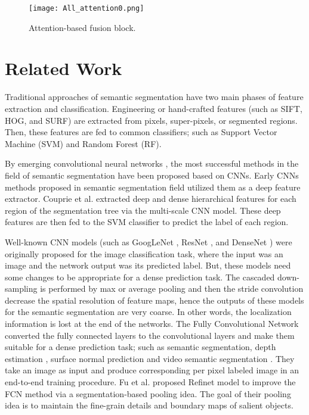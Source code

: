 \documentclass[journal,transmag]{IEEEtran}
\begin{document}
 
\begin{figure*}
	\begin{center}
		\texttt{[image: All\_attention0.png]}
	\end{center}
	\caption{Attention-based fusion block.}
	\label{fig:attention_block}
\end{figure*}

\section{Related Work}
\label{sec:2}

Traditional approaches of semantic segmentation\cite{ren2012rgb, silberman2011indoor, silberman2012indoor, gupta2013perceptual, gupta2014learning, cadena2013semantic,muller2014learning,shotton2006textonboost, fooladgardicta}  have two main phases of feature extraction and classification. Engineering or hand-crafted features (such as SIFT, HOG, and SURF) are extracted from pixels, super-pixels, or segmented regions. Then, these features are fed to common classifiers; such as Support Vector Machine (SVM)  and Random Forest (RF). 

By emerging convolutional neural networks \cite{krizhevsky2012imagenet, simonyan2014very,he2016deep}, the most successful methods in the field of semantic segmentation have been proposed based on CNNs. Early CNNs methods proposed in semantic segmentation field \cite{couprie2013indoor,girshick2014rich, farabet2013learning} utilized them as a deep feature extractor.  Couprie et al. \cite{couprie2013indoor} extracted deep and dense hierarchical features for each region of the segmentation tree \cite{arbelaez2011contour} via the multi-scale CNN model. These deep features are then fed to the SVM classifier to predict the label of each region.  

Well-known CNN models (such as GoogLeNet \cite{szegedy2015going}, ResNet \cite{he2016deep,he2016identity}, and DenseNet \cite{huang2017densely}) were originally proposed for the image classification task, where the input was an image and the network output was its predicted label. But, these models need some changes to be appropriate for a dense prediction task. The cascaded down-sampling is performed by max or average pooling and then the stride convolution decrease the spatial resolution of feature maps, hence the outputs of these models for the semantic segmentation are very coarse. In other words, the localization information is lost at the end of the networks. The Fully Convolutional Network \cite{long2015fully,long2015fully_jo} converted the fully connected layers to the convolutional layers and make them suitable for a dense prediction task; such as semantic segmentation, depth estimation \cite{eigen2015predicting,liu2015deep},  surface normal prediction \cite{eigen2015predicting} and video semantic segmentation \cite{qiu2017learning}. They take an image as input and produce corresponding per pixel labeled image in an end-to-end training procedure. Fu et al. \cite{fu2018refinet} proposed Refinet model to improve the FCN method via a segmentation-based pooling idea. The goal of their pooling idea is to maintain the fine-grain details and boundary maps of salient objects.
\end{document}
